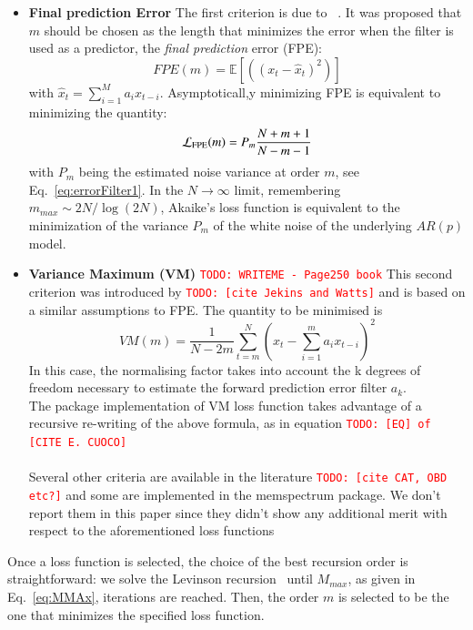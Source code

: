 \documentclass{aa}
\newcommand{\todo}[1]{{\textcolor{red}{\texttt{TODO: #1}} }}
\begin{document}
\begin{itemize}
\item \textbf{Final prediction Error} 
The first criterion is due to ~\citet{Akaike1970StatisticalPI}. It was proposed that $m$ should be chosen as the 
length that minimizes the error when the filter is used as a predictor, the \emph{final prediction} error (FPE): 
\begin{equation}
    FPE(m) = \mathbb{E}\left[ \left((x_t - \hat x_t) ^ 2\right) \right]
\end{equation}
with $\hat{x}_t = \sum_{i = 1}^M a_i x_{t - i}$.
Asymptoticall,y minimizing FPE is equivalent to minimizing the quantity: 
\begin{equation}
    \mathcal{L}_{\rm FPE}(m) = P_{m} \frac{N + m + 1}{N - m - 1}
\end{equation}
with $P_m$ being the estimated noise variance at order $m$, see Eq.~\eqref{eq:errorFilter1}. In the $N \to \infty$ limit, 
remembering $m_{max} \sim 2N / \log(2N)$, Akaike's loss function is equivalent to the minimization of the variance $P_m$ of the white noise of the underlying $AR(p)$ model. 

\item \textbf{Variance Maximum (VM)}
\todo{WRITEME - Page250 book}
This second criterion was introduced by \todo{[cite Jekins and Watts]} and is based on a similar assumptions to FPE. The quantity to be minimised is
\begin{equation}
VM(m) = \frac{1}{N - 2m}\sum_{t=m}^N\left(x_t - \sum_{i=1}^m a_i x_{t-i} \right)^{2}
\end{equation}
In this case, the normalising factor takes into account the k degrees of freedom necessary to estimate the forward prediction error filter $a_k$.\\
The package implementation of VM loss function takes advantage of a recursive re-writing of the above formula, as in equation \todo{[EQ] of [CITE E. CUOCO]}  \\ \\

Several other criteria are available in the literature \todo{[cite CAT, OBD etc?]} and some are implemented in the memspectrum package. We don't report them in this paper since they didn't show any additional merit with respect to the aforementioned loss functions \\
\end{itemize}

Once a loss function is selected, the choice of the best recursion order is straightforward: we solve the Levinson recursion~\citep{doi:10.1002/sapm1946251261} until $M_{max}$, as given in Eq.~\eqref{eq:MMAx}, iterations are reached. Then, the order $m$ is selected to be the one that minimizes the specified loss function.
\end{document}
